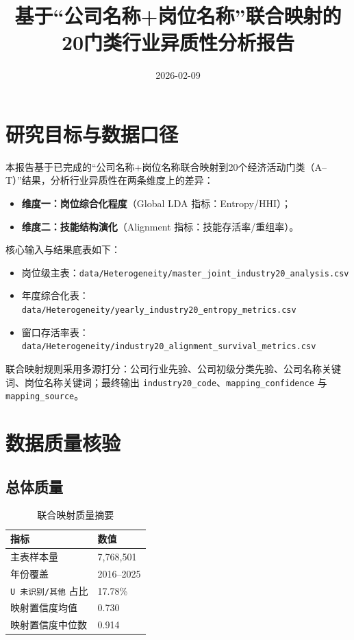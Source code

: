 \documentclass[12pt,a4paper]{ctexart}
\title{基于“公司名称+岗位名称”联合映射的\\20门类行业异质性分析报告}
\author{}
\date{2026-02-09}
\begin{document}
\maketitle

\section{研究目标与数据口径}
本报告基于已完成的“公司名称+岗位名称联合映射到20个经济活动门类（A--T）”结果，分析行业异质性在两条维度上的差异：
\begin{itemize}
    \item \textbf{维度一：岗位综合化程度}（Global LDA 指标：Entropy/HHI）；
    \item \textbf{维度二：技能结构演化}（Alignment 指标：技能存活率/重组率）。
\end{itemize}

核心输入与结果底表如下：
\begin{itemize}
    \item 岗位级主表：\texttt{data/Heterogeneity/master\_joint\_industry20\_analysis.csv}
    \item 年度综合化表：\texttt{data/Heterogeneity/yearly\_industry20\_entropy\_metrics.csv}
    \item 窗口存活率表：\texttt{data/Heterogeneity/industry20\_alignment\_survival\_metrics.csv}
\end{itemize}

联合映射规则采用多源打分：公司行业先验、公司初级分类先验、公司名称关键词、岗位名称关键词；最终输出 \texttt{industry20\_code}、\texttt{mapping\_confidence} 与 \texttt{mapping\_source}。

\section{数据质量核验}
\subsection{总体质量}
\begin{table}[H]
\centering
\caption{联合映射质量摘要}
\begin{tabular}{ll}
\toprule
指标 & 数值 \\
\midrule
主表样本量 & 7,768,501 \\
年份覆盖 & 2016--2025 \\
\texttt{U 未识别/其他} 占比 & 17.78\% \\
映射置信度均值 & 0.730 \\
映射置信度中位数 & 0.914 \\
\bottomrule
\end{tabular}
\end{table}
\end{document}
